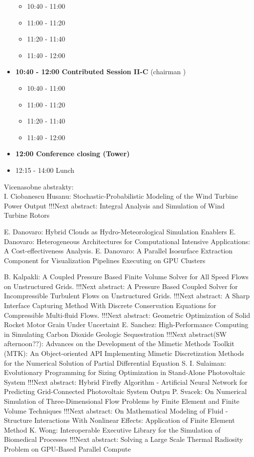 \documentclass[10pt, A4]{article}%
\begin{document}
\begin{itemize}
  \begin{itemize}
    \item 10:40 - 11:00 
    \item 11:00 - 11:20 
    \item 11:20 - 11:40 
    \item 11:40 - 12:00  
  \end{itemize}
  \item {\bf 10:40 - 12:00 Contributed Session II-C} (chairman ) 
  \begin{itemize}
    \item 10:40 - 11:00 
    \item 11:00 - 11:20 
    \item 11:20 - 11:40 
    \item 11:40 - 12:00 
  \end{itemize}
  \item {\bf 12:00 Conference closing (Tower)}
  \item 12:15 - 14:00 Lunch
\newpage
\end{itemize}



\newpage
Vicenasobne abstrakty:\\
{I. Ciobanescu Husanu}: {Stochastic-Probabilistic Modeling of the Wind Turbine Power Output       !!!Next abstract: Integral Analysis and Simulation of Wind Turbine Rotors}

{E. Danovaro}: {Hybrid Clouds as Hydro-Meteorological Simulation Enablers}
{E. Danovaro}: {Heterogeneous Architectures for Computational Intensive Applications: A Cost-effectiveness Analysis.}
{E. Danovaro}: {A Parallel Isosurface Extraction Component for Visualization Pipelines Executing on GPU Clusters}


{B. Kalpakli}: {A Coupled Pressure Based Finite Volume Solver for All Speed Flows on Unstructured Grids.      !!!Next abstract: A Pressure Based Coupled Solver for Incompressible Turbulent Flows on Unstructured Grids.      !!!Next abstract: A Sharp Interface Capturing Method With Discrete Conservation Equations for Compressible Multi-fluid Flows.      !!!Next abstract: Geometric Optimization of Solid Rocket Motor Grain Under Uncertaint}
{E. Sanchez}: {High-Performance Computing in Simulating Carbon Dioxide Geologic Sequestration      !!!Next abstract(SW afternoon??): Advances on the Development of the Mimetic Methods Toolkit (MTK): An Object-oriented API Implementing Mimetic Discretization Methods for the Numerical Solution of Partial Differential Equation}
{S. I. Sulaiman}: {Evolutionary Programming for Sizing Optimization in Stand-Alone Photovoltaic System      !!!Next abstract: Hybrid Firefly Algorithm - Artificial Neural Network for Predicting Grid-Connected Photovoltaic System Outpu}
{P. Svacek}: {On Numerical Simulation of Three-Dimensional Flow Problems by Finite Element and Finite Volume Techniques      !!!Next abstract: On Mathematical Modeling of Fluid - Structure Interactions With Nonlinear Effects: Application of Finite Element Method}
{K. Wong}: {Interoperable Executive Library for the Simulation of Biomedical Processes      !!!Next abstract: Solving a Large Scale Thermal Radiosity Problem on GPU-Based Parallel Compute}
\end{document}
